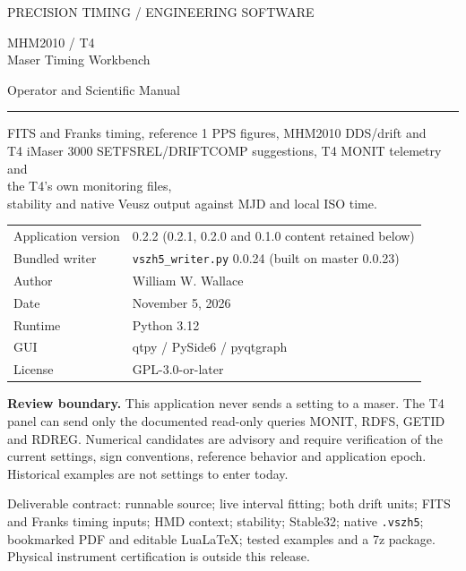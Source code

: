 \documentclass[11pt,a4paper]{article}
\newcommand{\warning}[1]{\par\noindent\colorbox{light}{\parbox{\dimexpr\linewidth-2\fboxsep}{\textbf{Review boundary.} #1}}\par}
\begin{document}
\begin{titlepage}
{\sffamily\color{teal}\large PRECISION TIMING / ENGINEERING SOFTWARE\par}
\vspace{18mm}
{\sffamily\color{navy}\Huge MHM2010 / T4\\Maser Timing Workbench\par}
\vspace{5mm}
{\sffamily\Large Operator and Scientific Manual\par}
\vspace{9mm}
\rule{\linewidth}{1pt}
\vspace{5mm}
{\large FITS and Franks timing, reference 1 PPS figures, MHM2010 DDS/drift and\\
T4 iMaser 3000 SETFSREL/DRIFTCOMP suggestions, T4 MONIT telemetry and\\
the T4's own monitoring files,\\
stability and native Veusz output against MJD and local ISO time.\par}
\vspace{12mm}
\begin{tabular}{@{}ll@{}}
Application version & 0.2.2 (0.2.1, 0.2.0 and 0.1.0 content retained below)\\
Bundled writer & \texttt{vszh5\_writer.py} 0.0.24 (built on master 0.0.23)\\
Author & William W. Wallace\\
Date & November 5, 2026\\
Runtime & Python 3.12\\
GUI & qtpy / PySide6 / pyqtgraph\\
License & GPL-3.0-or-later\\
\end{tabular}
\vfill
\warning{This application never sends a setting to a maser. The T4 panel can
send only the documented read-only queries MONIT, RDFS, GETID and RDREG.
Numerical candidates are advisory and require verification of the current
settings, sign conventions, reference behavior and application epoch.
Historical examples are not settings to enter today.}
\vspace{5mm}
{\small Deliverable contract: runnable source; live interval fitting; both drift
units; FITS and Franks timing inputs; HMD context; stability; Stable32; native
\texttt{.vszh5}; bookmarked PDF and editable LuaLaTeX; tested examples and a 7z package.
Physical instrument certification is outside this release.}
\end{titlepage}
\tableofcontents
\clearpage
\end{document}

